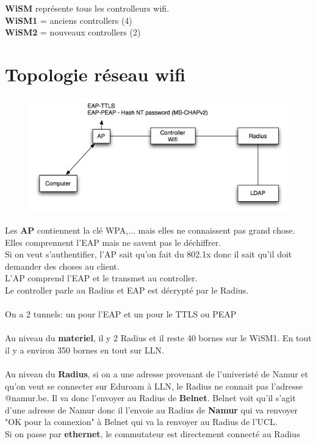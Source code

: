 \documentclass[10pt,a4paper]{article}
\begin{document}
\textbf{WiSM} représente tous les controlleurs wifi.\\
\textbf{WiSM1} = anciens controllers (4)\\
\textbf{WiSM2} = nouveaux controllers (2)

\section{Topologie réseau wifi}
\begin{figure}[h!]
   \includegraphics[scale=0.7]{images/infrastructure/topologie.png}
\end{figure}

Les \textbf{AP} contiennent la clé WPA,... mais elles ne connaissent pas grand chose. Elles comprennent l'EAP mais ne savent pas le déchiffrer.\\
Si on veut s'authentifier, l'AP sait qu'on fait du 802.1x donc il sait qu'il doit demander des choses au client.\\
L'AP comprend l'EAP et le transmet au controller.\\
Le controller parle au Radius et EAP est décrypté par le Radius.\\\\
On a 2 tunnels: un pour l'EAP et un pour le TTLS ou PEAP\\\\

Au niveau du \textbf{materiel}, il y 2 Radius et il reste 40 bornes sur le WiSM1. En tout il y a environ 350 bornes en tout sur LLN.\\\\

Au niveau du \textbf{Radius}, si on a une adresse provenant de l'univeristé de Namur et qu'on veut se connecter sur Eduroam à LLN, le Radius ne connait pas l'adresse @namur.be. Il va donc l'envoyer au Radius de \textbf{Belnet}. Belnet voit qu'il s'agit d'une adresse de Namur donc il l'envoie au Radius de \textbf{Namur} qui va renvoyer "OK pour la connexion" à Belnet qui va la renvoyer au Radius de l'UCL.\\
Si on passe par \textbf{ethernet}, le commutateur est directement connecté au Radius\\\\
\end{document}
